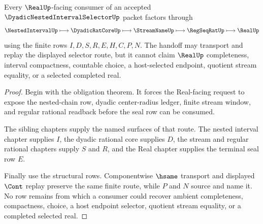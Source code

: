 \begin{theorem}
\label{thm:dyadic-nested-interval-selector-real-handoff}
Every $\RealUp$-facing consumer of an accepted $\DyadicNestedIntervalSelectorUp$ packet factors through
$$
\NestedIntervalUp \longmapsto \DyadicRatCoreUp \longmapsto \StreamNameUp \longmapsto \RegSeqRatUp \longmapsto \RealUp
$$
using the finite rows $I,D,S,R,E,H,C,P,N$. The handoff may transport and replay the displayed selector route, but it cannot claim $\RealUp$ completeness, interval compactness, countable choice, a host-selected endpoint, quotient stream equality, or a selected completed real.
\end{theorem}
\begin{proof}
Begin with the obligation theorem. It forces the Real-facing request to expose the nested-chain row, dyadic center-radius ledger, finite stream window, and regular rational readback before the seal row can be consumed.

The sibling chapters supply the named surfaces of that route. The nested interval chapter supplies $I$, the dyadic rational core supplies $D$, the stream and regular rational chapters supply $S$ and $R$, and the Real chapter supplies the terminal seal row $E$.

Finally use the structural rows. Componentwise $\hsame$ transport and displayed $\Cont$ replay preserve the same finite route, while $P$ and $N$ source and name it. No row remains from which a consumer could recover ambient completeness, compactness, choice, a host endpoint selector, quotient stream equality, or a completed selected real.
\end{proof}


